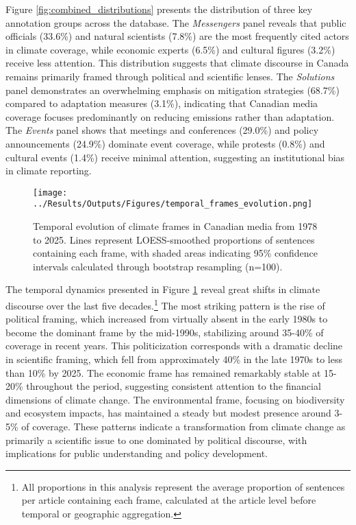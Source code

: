 \documentclass[12pt]{article}
\begin{document}
Figure \ref{fig:combined_distributions} presents the distribution of three key annotation groups across the database. The \emph{Messengers} panel reveals that public officials (33.6\%) and natural scientists (7.8\%) are the most frequently cited actors in climate coverage, while economic experts (6.5\%) and cultural figures (3.2\%) receive less attention. This distribution suggests that climate discourse in Canada remains primarily framed through political and scientific lenses. The \emph{Solutions} panel demonstrates an overwhelming emphasis on mitigation strategies (68.7\%) compared to adaptation measures (3.1\%), indicating that Canadian media coverage focuses predominantly on reducing emissions rather than adaptation. The \emph{Events} panel shows that meetings and conferences (29.0\%) and policy announcements (24.9\%) dominate event coverage, while protests (0.8\%) and cultural events (1.4\%) receive minimal attention, suggesting an institutional bias in climate reporting.

\begin{figure}[b!]
\centering
\texttt{[image: ../Results/Outputs/Figures/temporal\_frames\_evolution.png]}
\caption{Temporal evolution of climate frames in Canadian media from 1978 to 2025. Lines represent LOESS-smoothed proportions of sentences containing each frame, with shaded areas indicating 95\% confidence intervals calculated through bootstrap resampling (n=100).}
\label{fig:temporal_evolution}
\end{figure}

The temporal dynamics presented in Figure \ref{fig:temporal_evolution} reveal great shifts in climate discourse over the last five decades.\footnote{All proportions in this analysis represent the average proportion of sentences per article containing each frame, calculated at the article level before temporal or geographic aggregation.} The most striking pattern is the rise of political framing, which increased from virtually absent in the early 1980s to become the dominant frame by the mid-1990s, stabilizing around 35-40\% of coverage in recent years. This politicization corresponds with a dramatic decline in scientific framing, which fell from approximately 40\% in the late 1970s to less than 10\% by 2025. The economic frame has remained remarkably stable at 15-20\% throughout the period, suggesting consistent attention to the financial dimensions of climate change. The environmental frame, focusing on biodiversity and ecosystem impacts, has maintained a steady but modest presence around 3-5\% of coverage. These patterns indicate a transformation from climate change as primarily a scientific issue to one dominated by political discourse, with implications for public understanding and policy development.
\end{document}
